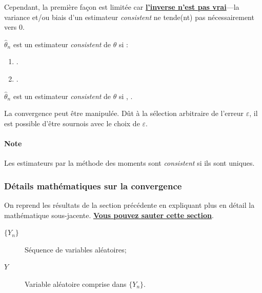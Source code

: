 \documentclass[10pt, french]{article}
\begin{document}
\begin{multicols*}{2}
Cependant, la première façon est limitée car \underline{\textbf{l'inverse n'est pas vrai}}---la variance et/ou biais d'un estimateur \og \textit{consistent} \fg{} ne tende(nt) pas nécessairement vers 0.

\begin{definitionNOHFILL}
$\hat{\theta}_{n}$ est un estimateur \og \textit{consistent} \fg{} de $\theta$ si :
\begin{enumerate}[label = \circled{\arabic*}{trueblue}]
	\item	{}.
	\item	{}.
\end{enumerate}

\tcbline

$\hat{\theta}_{n}$ est un estimateur \og \textit{consistent} \fg{} de $\theta$ si , .
\end{definitionNOHFILL}


\begin{rappel_enhanced}[Limitations]
La convergence peut être manipulée. Dût à la sélection arbitraire de l'erreur $\varepsilon$, il est possible d'être sournois avec le choix de $\varepsilon$.
\end{rappel_enhanced}

\paragraph{Note}	Les estimateurs par la méthode des moments sont \og \textit{consistent} \fg{} si ils sont uniques.



\subsubsection*{Détails mathématiques sur la convergence}
On reprend les résultats de la section précédente en expliquant plus en détail la mathématique sous-jacente. \textbf{\underline{Vous pouvez sauter cette section}}.

\begin{definitionNOHFILL}
\begin{distributions}[Notation]
\begin{description}
	\item[$\{Y_{n}\}$]	Séquence de variables aléatoires;
	\item[$Y$]	Variable aléatoire comprise dans $\{Y_{n}\}$.
\end{description}
\end{distributions}


\end{definitionNOHFILL}
\end{multicols*}
\end{document}
